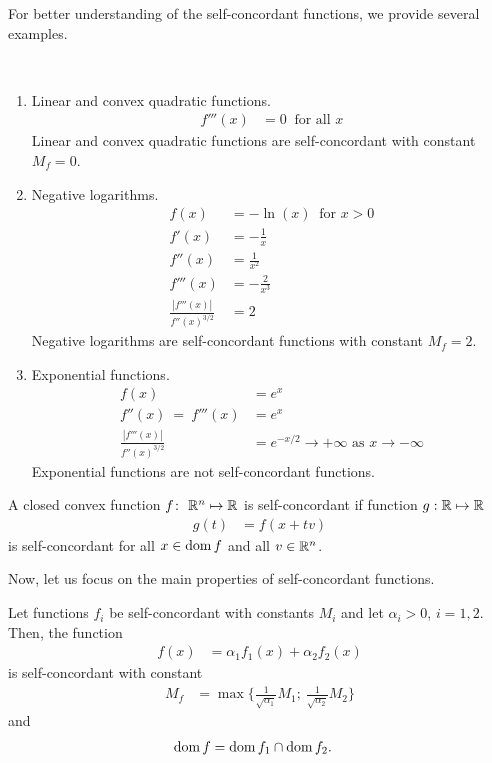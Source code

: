 For better understanding of the self-concordant functions, we provide several examples.

\begin{example}~
  \begin{enumerate}
    \item Linear and convex quadratic functions.
      \begin{align}
        f'''(x) &= 0\ \text{ for all } x
      \end{align}
      Linear and convex quadratic functions are self-concordant with constant $M_f = 0$.
    \item Negative logarithms.
      \begin{align}
        f(x) &= -\ln(x)\ \text{ for } x>0\\
        f'(x) &= -\frac{1}{x}\\
        f''(x) &= \frac{1}{x^2}\\
        f'''(x) &= -\frac{2}{x^3}\\
        \frac{|f'''(x)|}{f''(x)^{3/2}} &= 2
      \end{align}
      Negative logarithms are self-concordant functions with constant $M_f = 2$.

    \item Exponential functions.
      \begin{align}
        f(x) &= e^x\\
        f''(x) \ =\ f'''(x) &= e^x\\
        \frac{|f'''(x)|}{f''(x)^{3/2}} &= e^{-x/2} \rightarrow+\infty \text{ as } x\rightarrow-\infty
      \end{align}
      Exponential functions are not self-concordant functions.
  \end{enumerate}
\end{example}

\begin{definition}
  A closed convex function $f\colon~\mathbb{R}^n \mapsto \mathbb{R}$ is self-concordant if function $g: \mathbb{R} \mapsto \mathbb{R}$
  \begin{align}
    g(t) &= f(x + tv)
  \end{align}
  is self-concordant for all $x\in\operatorname{dom} f$ and all $v\in\mathbb{R}^n$.
\end{definition}

Now, let us focus on the main properties of self-concordant functions.

\begin{theorem}
  Let functions $f_i$ be self-concordant with constants $M_i$  and let $\alpha_i > 0$, $i = 1,2$. Then, the function
 \begin{align}
   f(x) &= \alpha_1f_1(x) + \alpha_2f_2(x)
 \end{align}
 is self-concordant with constant
 \begin{align}
   M_f &= \max \bigg\{\frac{1}{\sqrt{\alpha_1}}M_1;\ \frac{1}{\sqrt{\alpha_2}}M_2\bigg\}
 \end{align}
 and
 \begin{align}
   \operatorname{dom} f &= \operatorname{dom} f_1 \cap \operatorname{dom} f_2.
 \end{align}
\end{theorem}

